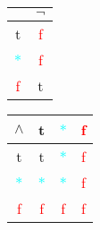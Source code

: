 				\begin{figure}[h]
					\centering
					\begin{subfigure}[h]{0.2\textwidth}

								\begin{tabular}{||c || c ||}  
									\hline
									 & $\neg $ \\  
									\hline\hline
									\textcolor{OliveGreen}{t} & \textcolor{red}{f}  \\ 
									\hline
									\textcolor{cyan}{$*$} & \textcolor{red}{f} \\
									\hline
									\textcolor{red}{f} & \textcolor{OliveGreen}{t}  \\
									\hline
								\end{tabular}
					\caption{}
					\end{subfigure}
				\hfil
				\centering
				\begin{subfigure}[h]{0.2\textwidth}
					\begin{tabular}{||c || c | c | c ||}  
						\hline
						$ \land $ & \textcolor{OliveGreen}{t} & \textcolor{cyan}{$*$} & \textcolor{red}{f} \\  
						\hline\hline
						\textcolor{OliveGreen}{t} & \textcolor{OliveGreen}{t} & \textcolor{cyan}{$*$} & \textcolor{red}{f}  \\ 
						\hline
						\textcolor{cyan}{$*$} & \textcolor{cyan}{$*$} & \textcolor{cyan}{$*$} & \textcolor{red}{f} \\
						\hline
						\textcolor{red}{f} & \textcolor{red}{f} & \textcolor{red}{f} & \textcolor{red}{f}  \\
						\hline
					\end{tabular}
					\caption{}
				\end{subfigure}
			

\end{figure}

